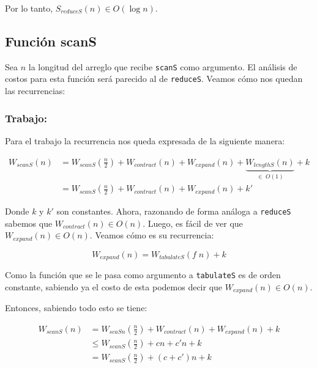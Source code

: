 \documentclass[11pt]{article}
\begin{document}
Por lo tanto, $S_{reduceS}(n) \in O(\log{n})$.


\subsection{Función scanS}

Sea $n$ la longitud del arreglo que recibe \texttt{scanS} como argumento. El
análisis de costos para esta función será parecido al de \texttt{reduceS}. Veamos
cómo nos quedan las recurrencias:

\subsubsection{Trabajo:}

Para el trabajo la recurrencia nos queda expresada de la siguiente manera:

\begin{align*}
    W_{scanS}(n) & = W_{scanS}(\frac{n}{2}) + W_{contract}(n) + W_{expand}(n) + \underbrace{W_{lengthS}(n)}_{\in \; O(1)} + k \\
                & = W_{scanS}(\frac{n}{2}) + W_{contract}(n) + W_{expand}(n) + k'
\end{align*}

Donde $k$ y $k'$ son constantes. Ahora, razonando de forma análoga a \texttt{reduceS} sabemos 
que \newline $W_{contract}(n) \in O(n)$. Luego, es fácil de ver que $W_{expand}(n) \in O(n)$. 
Veamos cómo es su recurrencia:

\begin{equation*}
    W_{expand}(n) = W_{tabulateS}(f \; n) + k 
\end{equation*}

Como la función que se le pasa como argumento a \texttt{tabulateS} es de orden
constante, sabiendo ya el costo de esta podemos decir que
$W_{expand}(n) \in O(n)$.

Entonces, sabiendo todo esto se tiene:

\begin{align*}
    W_{scanS}(n) & = W_{scaSn}(\frac{n}{2}) + W_{contract}(n) + W_{expand}(n) + k \\
                & \leq W_{scanS}(\frac{n}{2}) + cn + c'n + k \\
                & = W_{scanS}(\frac{n}{2}) + (c + c')n + k 
\end{align*}
\end{document}
